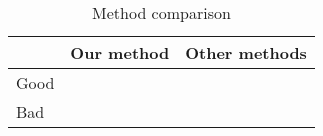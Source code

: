 \begin{table}[!htp]
	\normalsize
	\begin{tabular}{lcc}
		\toprule
             & Our method & Other methods\\
		\midrule
		Good & \checkmark & \xmark \\
		Bad  & \xmark     & \checkmark
		\bottomrule
	\end{tabular}
	\caption{Method comparison}
    \label{tab:comparison}
\end{table}
